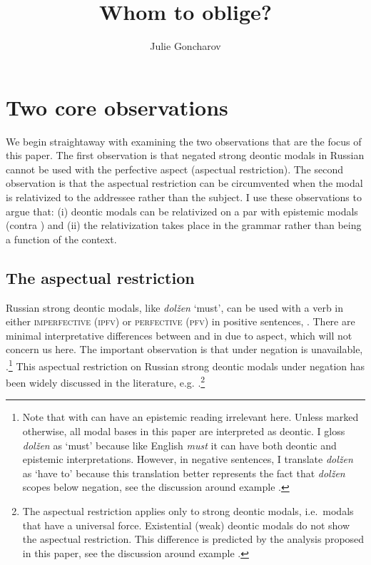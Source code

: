 \documentclass[output=paper,
modfonts,
newtxmath,colorlinks,citecolor=brown
]{langscibook}
\title{Whom to oblige?}
\author{Julie Goncharov\affiliation{Hebrew University of Jerusalem / University of Göttingen}
}
\begin{document}
\maketitle

\section{Two core observations}\label{sect:coreobs}
We begin straightaway with examining the two observations that are the focus of this paper. The first observation is that negated strong deontic modals in Russian cannot be used with the perfective aspect  (aspectual restriction). The second observation is that the aspectual restriction can be circumvented when the modal is relativized to the addressee rather than the subject. I use these observations to argue that: (i) deontic modals can be relativized on a par with epistemic modals (contra \citealt{ret16}) and (ii) the relativization takes place in the grammar rather than being a function of the context. 


\subsection{The aspectual restriction}
Russian strong deontic modals, like \textit{dolžen} 	`must', can be used with a verb in either \textsc{imperfective (ipfv)} or \textsc{perfective (pfv)} in positive sentences, . There are minimal interpretative differences between \im and \p in  due to aspect, which will not concern us here.  The important observation is that  under negation \p is unavailable, .\footnote{Note that  with \p can have an epistemic reading irrelevant here. Unless marked otherwise, all modal bases in this paper are interpreted as deontic. I gloss \textit{dolžen} as `must' because like English \textit{must} it can have both deontic and epistemic interpretations. However, in negative sentences, I translate \textit{dolžen} as `have to' because this translation better represents the fact that \textit{dolžen} scopes below negation, see the discussion around  example .
}
This aspectual restriction on Russian strong deontic modals under negation has been widely discussed in the literature, e.g. \cite{for70,rap85,haa97,zal06,pad13}.\footnote{The aspectual restriction applies only to strong deontic modals, i.e.\ modals that have a universal force. Existential (weak) deontic modals do not show the aspectual restriction. This difference is predicted by the analysis proposed in this paper, see the discussion around example .
} 
\end{document}
